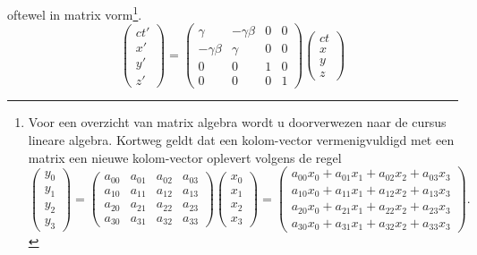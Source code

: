 oftewel in matrix vorm\footnote{Voor een overzicht van matrix algebra wordt u doorverwezen naar
de cursus lineare algebra. Kortweg geldt dat een kolom-vector vermenigvuldigd met een matrix een nieuwe kolom-vector oplevert volgens de regel
\[
\left( \begin{array}{c} y_0 \\ y_1 \\ y_2 \\ y_3 \end{array} \right) =
\left( \begin{array}{cccc} a_{00} & a_{01} & a_{02} & a_{03} \\ 
                           a_{10} & a_{11} & a_{12} & a_{13} \\ 
                           a_{20} & a_{21} & a_{22} & a_{23} \\ 
                           a_{30} & a_{31} & a_{32} & a_{33} \end{array} \right) 
\left( \begin{array}{c} x_0 \\ x_1 \\ x_2 \\ x_3 \end{array} \right) =
\left( \begin{array}{c} a_{00} x_0 + a_{01} x_1 + a_{02} x_2 + a_{03} x_3 \\ 
                        a_{10} x_0 + a_{11} x_1 + a_{12} x_2 + a_{13} x_3 \\ 
                        a_{20} x_0 + a_{21} x_1 + a_{22} x_2 + a_{23} x_3 \\ 
                        a_{30} x_0 + a_{31} x_1 + a_{32} x_2 + a_{33} x_3  \end{array} \right). 
\]}.
\begin{equation}
\left( \begin{array}{c} ct' \\ x' \\ y' \\ z' \end{array} \right) =
\left( \begin{array}{cccc} \gamma & -\gamma \beta & 0 & 0  \\ -\gamma\beta & \gamma & 0 & 0  \\ 0 & 0 & 1 & 0  \\ 0 & 0 & 0 & 1 
\end{array} \right) 
\left( \begin{array}{c} ct \\ x \\ y \\ z \end{array} \right) 
\end{equation}
